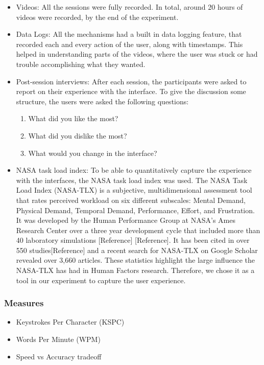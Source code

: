 \begin{itemize}
\item Videos: All the sessions were fully recorded. In total, around
  20 hours of videos were recorded, by the end of the experiment.
\item Data Logs: All the mechanisms had a built in data logging
  feature, that recorded each and every action of the user, along with
  timestamps. This helped in understanding parts of the videos, where
  the user was stuck or had trouble accomplishing what they wanted.
\item Post-session interviews: After each session, the participants
  were asked to report on their experience with the interface. To give
  the discussion some structure, the users were asked the following
  questions:

\begin{enumerate}
	\item What did you like the most?
	\item What did you dislike the most?
	\item What would you change in the interface?
\end{enumerate}

\item NASA task load index: To be able to quantitatively capture the
  experience with the interfaces, the NASA task load index was
  used. The NASA Task Load Index (NASA-TLX) is a subjective,
  multidimensional assessment tool that rates perceived workload on
  six different subscales: Mental Demand, Physical Demand, Temporal
  Demand, Performance, Effort, and Frustration. It was developed by
  the Human Performance Group at NASA's Ames Research Center over a
  three year development cycle that included more than 40 laboratory
  simulations [Reference] [Reference]. It has been cited in over 550
  studies[Reference] and a recent search for NASA-TLX on Google
  Scholar revealed over 3,660 articles. These statistics highlight the
  large influence the NASA-TLX has had in Human Factors
  research. Therefore, we chose it as a tool in our experiment to
  capture the user experience.

\end{itemize}
\subsubsection{Measures}
\begin{itemize}
	\item Keystrokes Per Character (KSPC)
	\item Words Per Minute (WPM)
	\item Speed vs Accuracy tradeoff 
\end{itemize}
